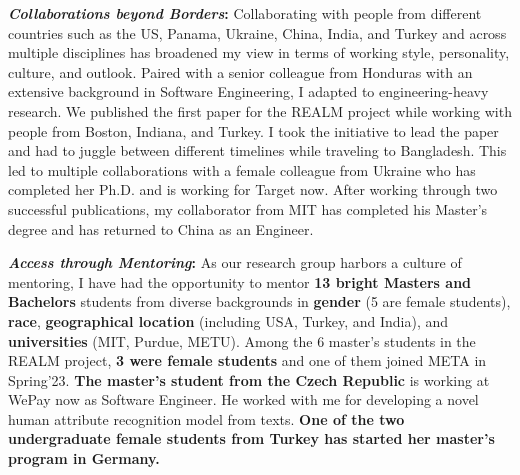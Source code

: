 \documentclass[9pt]{article}
\newcommand*\heading[1]{\textbf{\textit{#1}:}}
\begin{document}
\heading{Collaborations beyond Borders}
Collaborating with people from different countries
such as the US, Panama, Ukraine, China, India, and Turkey
and across multiple disciplines 
has broadened my view in terms of working style, personality, culture, and outlook. 
Paired with a senior colleague from Honduras with an extensive background in Software Engineering, I adapted to engineering-heavy research. We published the first paper for the REALM project while working with people from Boston, Indiana, and Turkey. I took the initiative to lead the paper and had to juggle between different timelines while traveling to Bangladesh.
This led to multiple collaborations with a female colleague from Ukraine who has completed her Ph.D. and is working for Target now. 
After working through two successful publications, my collaborator from MIT has completed his Master's degree and has returned to China as an Engineer.

 \heading{Access through Mentoring}
 As our research group harbors a culture of mentoring, I have had the opportunity to mentor \textbf{13 bright Masters and Bachelors}
 students from diverse backgrounds in \textbf{gender} (5 are female students), \textbf{race}, \textbf{geographical location} (including USA, Turkey, and India), and \textbf{universities} (MIT, Purdue, METU). Among the 6 master's students in the REALM project, \textbf{3 were female students} and one of them joined META in Spring'23.
 \textbf{The master's student from the Czech Republic} is working at WePay now as Software Engineer. He worked with me for developing a novel human attribute recognition model from texts. 
\textbf{One of the two undergraduate female students from Turkey has started her master's program in Germany.}
\end{document}
